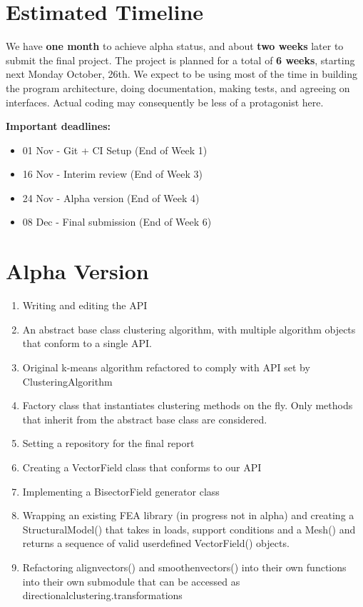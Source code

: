 \documentclass[11pt]{article}
\begin{document}
\section{Estimated Timeline}

We have \textbf{one month} to achieve alpha status, and about \textbf{two weeks} later to submit the final project. The project is planned for a total of \textbf{6 weeks}, starting next Monday October, 26th. We expect to be using most of the time in building the program architecture, doing documentation, making tests, and agreeing on interfaces. Actual coding may consequently be less of a protagonist here.

\textbf{Important deadlines:}
\begin{itemize}
    \item 01 Nov - Git + CI Setup (End of Week 1)
    \item 16 Nov - Interim review (End of Week 3)
    \item 24 Nov - Alpha version (End of Week 4)
    \item 08 Dec - Final submission (End of Week 6)
\end{itemize}

\section{Alpha Version}

\begin{enumerate}
    \item Writing and editing the API
    \item An abstract base class clustering algorithm, with multiple algorithm objects that conform to
a single API.
    \item Original k-means algorithm refactored to comply with API set by ClusteringAlgorithm
    \item Factory class that instantiates clustering methods on the fly. Only methods that inherit from the abstract base class are considered.
    \item Setting a repository for the final report
    \item Creating a VectorField class that conforms to our API
    \item Implementing a BisectorField generator class
    \item Wrapping an existing FEA library (in progress not in alpha) and creating a StructuralModel() that takes in loads, support conditions and a Mesh() and returns a sequence of valid userdefined VectorField() objects.
    \item Refactoring alignvectors() and smoothenvectors() into their own functions into their own submodule that can be accessed as directionalclustering.transformations

\end{enumerate}
\end{document}
